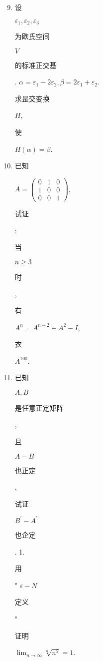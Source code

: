\documentclass[10pt]{article}
\begin{document}
\begin{enumerate}
  \setcounter{enumi}{8}
  \item \begin{CJK}{UTF8}{mj}设\end{CJK} $\varepsilon_{1}, \varepsilon_{2}, \varepsilon_{3}$ \begin{CJK}{UTF8}{mj}为欧氏空间\end{CJK} $V$ \begin{CJK}{UTF8}{mj}的标准正交基\end{CJK}. $\alpha=\varepsilon_{1}-2 \varepsilon_{2}, \beta=2 \varepsilon_{1}+\varepsilon_{2}$. \begin{CJK}{UTF8}{mj}求昰交变换\end{CJK} $H$, \begin{CJK}{UTF8}{mj}使\end{CJK} $H(\alpha)=\beta$.

  \item \begin{CJK}{UTF8}{mj}已知\end{CJK} $A=\left(\begin{array}{lll}0 & 1 & 0 \\ 1 & 0 & 0 \\ 0 & 0 & 1\end{array}\right)$, \begin{CJK}{UTF8}{mj}试证\end{CJK}: \begin{CJK}{UTF8}{mj}当\end{CJK} $n \geq 3$ \begin{CJK}{UTF8}{mj}时\end{CJK}, \begin{CJK}{UTF8}{mj}有\end{CJK} $A^{n}=A^{n-2}+A^{2}-I$, \begin{CJK}{UTF8}{mj}衣\end{CJK} $A^{100}$.

  \item \begin{CJK}{UTF8}{mj}已知\end{CJK} $A, B$ \begin{CJK}{UTF8}{mj}是任意正定矩阵\end{CJK}, \begin{CJK}{UTF8}{mj}且\end{CJK} $A-B$ \begin{CJK}{UTF8}{mj}也正定\end{CJK}, \begin{CJK}{UTF8}{mj}试证\end{CJK} $B^{\prime}-A^{\prime}$ \begin{CJK}{UTF8}{mj}也企定\end{CJK}. 1. \begin{CJK}{UTF8}{mj}用\end{CJK}" $\varepsilon-N$ \begin{CJK}{UTF8}{mj}定义\end{CJK}" \begin{CJK}{UTF8}{mj}证明\end{CJK} $\lim _{n \rightarrow \infty} \sqrt[n]{n^{2}}=1$.

\end{enumerate}
\end{document}

